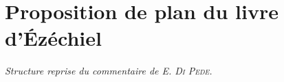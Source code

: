 \section*{Proposition de plan du livre d'Ézéchiel}
\textit{Structure reprise du commentaire de \textsc{E. Di Pede}.}

